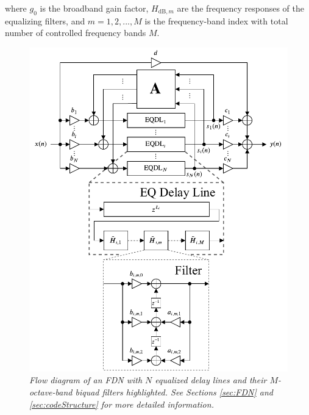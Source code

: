 \documentclass[twoside,a4paper]{article}
\begin{document}
\noindent where $g_0$ is the broadband gain factor, $H_{\textrm{dB},m}$ are the frequency responses of the equalizing filters, and $m = 1,2,...,M$ is the frequency-band index with total number of controlled frequency bands $M$.



\begin{figure}[t!]

\centering
\includegraphics[width=\columnwidth]{Figures/FDN.pdf}
\caption{\textit{Flow diagram of an FDN with $N$ equalized delay lines and their $M$-octave-band biquad filters highlighted. See Sections \ref{sec:FDN} and \ref{sec:codeStructure} for more detailed information. }}
\label{fig:diag}
\end{figure}
\end{document}
